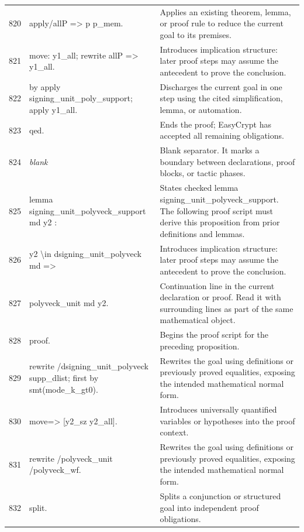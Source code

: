 \documentclass[10pt]{article}
\begin{document}
\begin{longtable}{r L{0.53\textwidth} L{0.37\textwidth}}
820 & {\ttfamily\scriptsize apply/allP => p p\_mem.} & Applies an existing theorem, lemma, or proof rule to reduce the current goal to its premises. \\
821 & {\ttfamily\scriptsize move: y1\_all; rewrite allP => y1\_all.} & Introduces implication structure: later proof steps may assume the antecedent to prove the conclusion. \\
822 & {\ttfamily\scriptsize by apply signing\_unit\_poly\_support; apply y1\_all.} & Discharges the current goal in one step using the cited simplification, lemma, or automation. \\
823 & {\ttfamily\scriptsize qed.} & Ends the proof; EasyCrypt has accepted all remaining obligations. \\
824 & {\ttfamily\scriptsize \emph{blank}} & Blank separator.  It marks a boundary between declarations, proof blocks, or tactic phases. \\
825 & {\ttfamily\scriptsize lemma signing\_unit\_polyveck\_support md y2 :} & States checked lemma signing\_unit\_polyveck\_support.  The following proof script must derive this proposition from prior definitions and lemmas. \\
826 & {\ttfamily\scriptsize   y2 \textbackslash{}in dsigning\_unit\_polyveck md =>} & Introduces implication structure: later proof steps may assume the antecedent to prove the conclusion. \\
827 & {\ttfamily\scriptsize   polyveck\_unit md y2.} & Continuation line in the current declaration or proof.  Read it with surrounding lines as part of the same mathematical object. \\
828 & {\ttfamily\scriptsize proof.} & Begins the proof script for the preceding proposition. \\
829 & {\ttfamily\scriptsize rewrite /dsigning\_unit\_polyveck supp\_dlist; first by smt(mode\_k\_gt0).} & Rewrites the goal using definitions or previously proved equalities, exposing the intended mathematical normal form. \\
830 & {\ttfamily\scriptsize move=> [y2\_sz y2\_all].} & Introduces universally quantified variables or hypotheses into the proof context. \\
831 & {\ttfamily\scriptsize rewrite /polyveck\_unit /polyveck\_wf.} & Rewrites the goal using definitions or previously proved equalities, exposing the intended mathematical normal form. \\
832 & {\ttfamily\scriptsize split.} & Splits a conjunction or structured goal into independent proof obligations. \\

\end{longtable}
\end{document}

